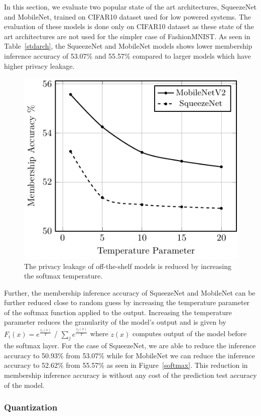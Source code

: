 In this section, we evaluate two popular state of the art architectures, SqueezeNet and MobileNet, trained on CIFAR10 dataset used for low powered systems.
The evaluation of these models is done only on CIFAR10 dataset as these state of the art architectures are not used for the simpler case of FashionMNIST.
As seen in Table~\ref{stdarch}, the SqueezeNet and MobileNet models shows lower membership inference accuracy of 53.07\% and 55.57\% compared to larger models which have higher privacy leakage.

\begin{figure}
  \includegraphics[width=0.7\columnwidth]{figures/efficientArch.pdf}
  \caption{The privacy leakage of off-the-shelf models is reduced by increasing the softmax temperature.}
  \label{fig:wtsharing}
\end{figure}

Further, the membership inference accuracy of SqueezeNet and MobileNet can be further reduced close to random guess by increasing the temperature parameter of the softmax function applied to the output.
Increasing the temperature parameter reduces the granularity of the model's output and is given by $F_i(x) = e^{\frac{z_i(x)}{T}}$ / $ \sum_{j}e^{\frac{z_j(x)}{T}}$ where $z(x)$ computes output of the model before the softmax layer.
For the case of SqueezeNet, we are able to reduce the inference accuracy to 50.93\% from 53.07\% while for MobileNet we can reduce the inference accuracy to 52.62\% from 55.57\% as seen in Figure~\ref{softmax}.
This reduction in membership inference accuracy is without any cost of the prediction test accuracy of the model.




\subsubsection{Quantization}\label{quant}

